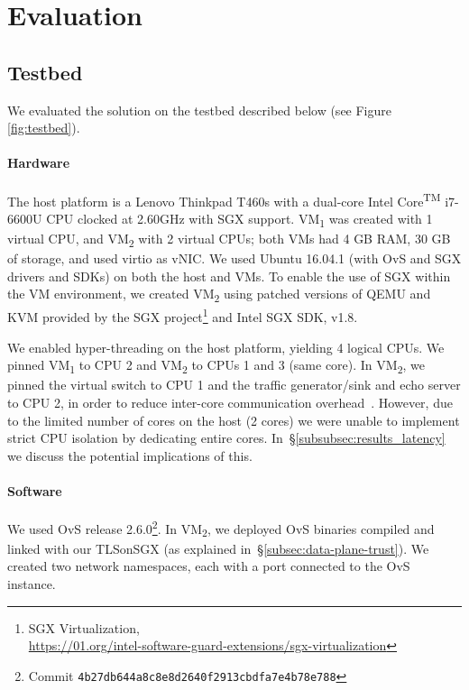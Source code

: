 {%
\section{Evaluation}
\label{sec:eval}

\subsection{Testbed}
\label{subsec:testbed}
We evaluated the solution on the testbed described below (see Figure \ref{fig:testbed}).%
\paragraph{Hardware}
The host platform is a Lenovo Thinkpad T460s with a dual-core Intel Core\textsuperscript{TM} i7-6600U CPU clocked at 2.60GHz with SGX support.
VM\textsubscript{1} was created with 1 virtual CPU, and VM\textsubscript{2} with 2 virtual CPUs;
both VMs had 4 GB RAM, 30 GB of storage, and used virtio as vNIC.
We used Ubuntu 16.04.1 (with OvS and SGX drivers and SDKs) on both the host and VMs.
To enable the use of SGX within the VM environment, we created VM\textsubscript{2} using patched versions of QEMU and KVM provided by the SGX project\footnote{SGX Virtualization, \\\url{https://01.org/intel-software-guard-extensions/sgx-virtualization}} and Intel SGX SDK, v1.8. %

We enabled hyper-threading on the host platform, yielding 4 logical CPUs.
We pinned VM\textsubscript{1} to CPU 2 and VM\textsubscript{2} to CPUs 1 and 3 (same core).
In VM\textsubscript{2}, we pinned the virtual switch to CPU 1 and the traffic generator/sink and echo server to CPU 2, in order to reduce inter-core communication overhead~\cite{sekar:2012}. 
However, due to the limited number of cores on the host (2 cores) we were unable to implement strict CPU isolation by dedicating entire cores.
In~\S\ref{subsubsec:results_latency} we discuss the potential implications of this.

\paragraph{Software}
We used OvS release 2.6.0\footnote{Commit \texttt{4b27db644a8c8e8d2640f2913cbdfa7e4b78e788}}.
In VM\textsubscript{2}, we deployed OvS binaries compiled and linked with our TLSonSGX (as explained in~\S\ref{subsec:data-plane-trust}).
We created two network namespaces, each with a port connected to the OvS instance.

}
